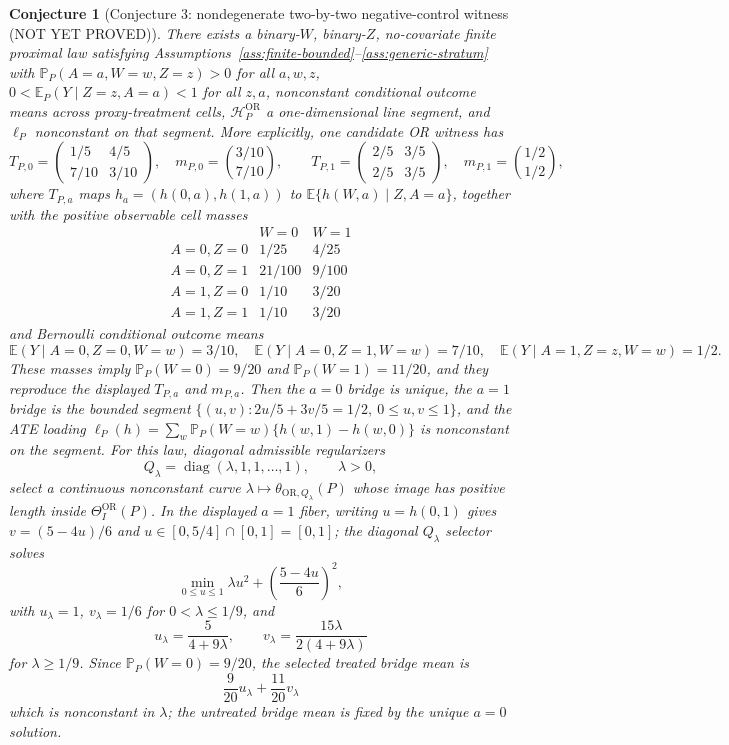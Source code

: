 \documentclass[11pt]{article}
\newcommand{\E}{\mathbb{E}}
\renewcommand{\Pr}{\mathbb{P}}
\newcommand{\calH}{\mathcal{H}}
\theoremstyle{definition}
\theoremstyle{plain}
\newtheorem{conjecture}{Conjecture}
\theoremstyle{remark}
\begin{document}
\begin{conjecture}[Conjecture 3: nondegenerate two-by-two negative-control witness (NOT YET PROVED)]\label{conj:binary-witness}
There exists a binary-\(W\), binary-\(Z\), no-covariate finite proximal law
satisfying Assumptions~\ref{ass:finite-bounded}--\ref{ass:generic-stratum}
with \(\Pr_P(A=a,W=w,Z=z)>0\) for all \(a,w,z\),
\(0<\E_P(Y\mid Z=z,A=a)<1\) for all \(z,a\), nonconstant conditional outcome
means across proxy-treatment cells, \(\calH_P^{\mathrm{OR}}\) a
one-dimensional line segment, and \(\ell_P\) nonconstant on that segment.
More explicitly, one candidate OR witness has
\[
T_{P,0}=
\begin{pmatrix}
1/5&4/5\\
7/10&3/10
\end{pmatrix},
\quad
m_{P,0}=\binom{3/10}{7/10},
\qquad
T_{P,1}=
\begin{pmatrix}
2/5&3/5\\
2/5&3/5
\end{pmatrix},
\quad
m_{P,1}=\binom{1/2}{1/2},
\]
where \(T_{P,a}\) maps \(h_a=(h(0,a),h(1,a))\) to
\(\E\{h(W,a)\mid Z,A=a\}\), together with the positive observable cell
masses
\[
\begin{array}{c|cc}
&W=0&W=1\\ \hline
A=0,Z=0&1/25&4/25\\
A=0,Z=1&21/100&9/100\\
A=1,Z=0&1/10&3/20\\
A=1,Z=1&1/10&3/20
\end{array}
\]
and Bernoulli conditional outcome means
\[
\E(Y\mid A=0,Z=0,W=w)=3/10,\quad
\E(Y\mid A=0,Z=1,W=w)=7/10,\quad
\E(Y\mid A=1,Z=z,W=w)=1/2.
\]
These masses imply \(\Pr_P(W=0)=9/20\) and
\(\Pr_P(W=1)=11/20\), and they reproduce the displayed \(T_{P,a}\) and
\(m_{P,a}\).  Then the
\(a=0\) bridge is unique, the \(a=1\) bridge is the bounded segment
\(\{(u,v):2u/5+3v/5=1/2,\ 0\le u,v\le1\}\), and the ATE loading
\(\ell_P(h)=\sum_w \Pr_P(W=w)\{h(w,1)-h(w,0)\}\) is nonconstant on the segment.
For this law, diagonal admissible regularizers
\[
Q_\lambda=\operatorname{diag}(\lambda,1,1,\ldots,1),\qquad \lambda>0,
\]
select a continuous nonconstant curve
\(\lambda\mapsto\theta_{\mathrm{OR},Q_\lambda}(P)\) whose image has positive
length inside \(\Theta_I^{\mathrm{OR}}(P)\).  In the displayed \(a=1\) fiber, writing
\(u=h(0,1)\) gives \(v=(5-4u)/6\) and \(u\in[0,5/4]\cap[0,1]=[0,1]\);
the diagonal \(Q_\lambda\) selector solves
\[
\min_{0\le u\le1}\lambda u^2+\left(\frac{5-4u}{6}\right)^2,
\]
with \(u_\lambda=1\), \(v_\lambda=1/6\) for \(0<\lambda\le 1/9\), and
\[
u_\lambda=\frac{5}{4+9\lambda},\qquad
v_\lambda=\frac{15\lambda}{2(4+9\lambda)}
\]
for \(\lambda\ge1/9\).
Since \(\Pr_P(W=0)=9/20\), the selected treated bridge mean is
\[
\frac{9}{20}u_\lambda+\frac{11}{20}v_\lambda
\]
which is nonconstant in \(\lambda\); the untreated bridge mean is fixed by
the unique \(a=0\) solution.
\end{conjecture}
\end{document}
